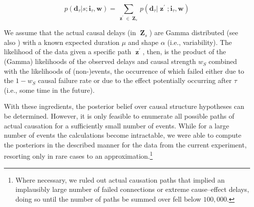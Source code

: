 \documentclass[10pt,letterpaper]{article}
\newcommand{\sntodo}[2][]
{\todo[size=\footnotesize, color = yellow, #1]{#2}~}
\newcommand{\ww}{\mathbf{w}} %
\newcommand{\ws}{w_S} %
\newcommand{\mm}{s} %
\newcommand{\ci}{\mathbf{i}} %
\newcommand{\da}{\mathbf{d}} %
\DeclareMathOperator*{\zz}{\mathbf{z}} %
\DeclareMathOperator*{\zzz}{\mathbf{Z}} %
\begin{document}
\begin{equation}
p(\da_{\tau}|\mm;\ci_{\tau}, \ww) = \sum_{\zz^\prime \in \zzz_{\mm}}p(\da_{\tau}|{\zz}^{\prime}; \ci_{\tau}, \ww)
\label{eq:ti_mar_li}
\end{equation}

We assume that the actual causal delays (in $\zzz_{\mm}$) are Gamma distributed (see also \citealp{bramley2017time}) with a known expected duration $\mu$ and shape $\alpha$ (i.e., variability). The likelihood of the data given a specific path $\zz^\prime$, then, is the product of the (Gamma) likelihoods of the observed delays and causal strength $\ws$ combined with the likelihoods of (non-)events, the occurrence of which failed either due to the $1-\ws$ causal failure rate or due to the effect potentially occurring after $\tau$ (i.e., some time in the future).

With these ingredients, the posterior belief over causal structure hypotheses can be determined. However, it is only feasible to enumerate all possible paths of actual causation for a sufficiently small number of events. While for a large number of events the calculations become intractable, we were able to compute the posteriors in the described manner for the data from the current experiment, resorting only in rare cases to an approximation.\footnote{Where necessary, we ruled out actual causation paths that implied an implausibly large number of failed connections or extreme cause--effect delays, doing so until the number of paths be summed over fell below $100,000$.}




\end{document}
